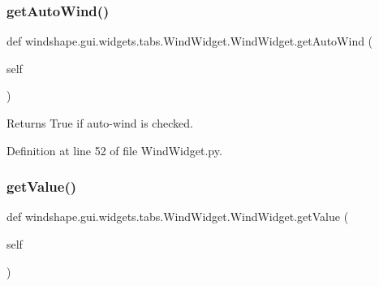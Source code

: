 \subsubsection{\texorpdfstring{get\+Auto\+Wind()}{getAutoWind()}}
{\footnotesize\ttfamily def windshape.\+gui.\+widgets.\+tabs.\+Wind\+Widget.\+Wind\+Widget.\+get\+Auto\+Wind (\begin{DoxyParamCaption}\item[{}]{self }\end{DoxyParamCaption})}

\begin{DoxyVerb}Returns True if auto-wind is checked.\end{DoxyVerb}
 

Definition at line 52 of file Wind\+Widget.\+py.

\mbox{\label{classwindshape_1_1gui_1_1widgets_1_1tabs_1_1_wind_widget_1_1_wind_widget_ac7b6bebf61dcc8dbe6e48eeb0cc0e0d3}} 
\subsubsection{\texorpdfstring{get\+Value()}{getValue()}}
{\footnotesize\ttfamily def windshape.\+gui.\+widgets.\+tabs.\+Wind\+Widget.\+Wind\+Widget.\+get\+Value (\begin{DoxyParamCaption}\item[{}]{self }\end{DoxyParamCaption})}

